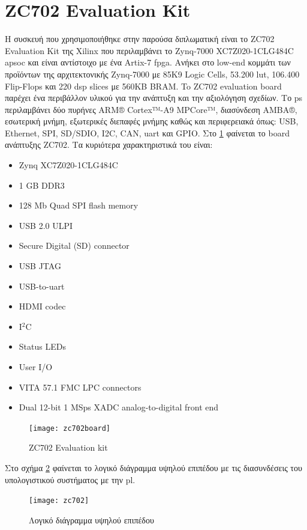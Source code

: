 \section{ZC702 Evaluation Kit}
Η συσκευή που χρησιμοποιήθηκε στην παρούσα διπλωματική είναι το ZC702 Evaluation Kit της Xilinx που περιλαμβάνει το Zynq-7000 XC7Z020-1CLG484C \gls{apsoc} και είναι αντίστοιχο με ένα Artix-7 \gls{fpga}. Ανήκει στο low-end κομμάτι των προϊόντων της αρχιτεκτονικής Zynq-7000 με 85K9 Logic Cells, 53.200 \gls{lut}, 106.400 Flip-Flops και 220 \gls{dsp} slices με 560KB BRAM. To ZC702 evaluation board παρέχει ένα περιβάλλον υλικού για την ανάπτυξη και την αξιολόγηση σχεδίων. Το \gls{ps} περιλαμβάνει δύο πυρήνες ARM® Cortex™-A9 MPCore™, διασύνδεση AMBA®, εσωτερική μνήμη, εξωτερικές διεπαφές μνήμης καθώς και περιφερειακά όπως: USB, Ethernet, SPI, SD/SDIO, I2C, CAN, \gls{uart} και GPIO. Στο \ref{fig:zc702board} φαίνεται το board ανάπτυξης ZC702. Τα κυριότερα χαρακτηριστικά του είναι:
\begin{itemize}
	\item Zynq XC7Z020-1CLG484C
	\item 1 GB DDR3
	\item 128 Mb Quad SPI flash memory
	\item USB 2.0 ULPI
	\item Secure Digital (SD) connector
	\item USB JTAG
	\item USB-to-\gls{uart}
	\item HDMI codec
	\item I$^2$C
	\item Status LEDs
	\item User I/O
	\item VITA 57.1 FMC LPC connectors
	\item Dual 12-bit 1 MS\gls{ps} XADC analog-to-digital front end \\
\end{itemize}
\begin{figure}[H]
  	\centering
	\texttt{[image: zc702board]}
	\caption{ZC702 Evaluation kit \cite{UG926}}
	\label{fig:zc702board}
\end{figure}

Στο σχήμα \ref{fig:hlbd} φαίνεται το λογικό διάγραμμα υψηλού επιπέδου με τις διασυνδέσεις του υπολογιστικού συστήματος με την \gls{pl}. \\

\begin{figure}[H]
  	\centering
	\texttt{[image: zc702]}\\
	\caption{Λογικό διάγραμμα υψηλού επιπέδου \cite{ug850}}
	\label{fig:hlbd}
\end{figure}

